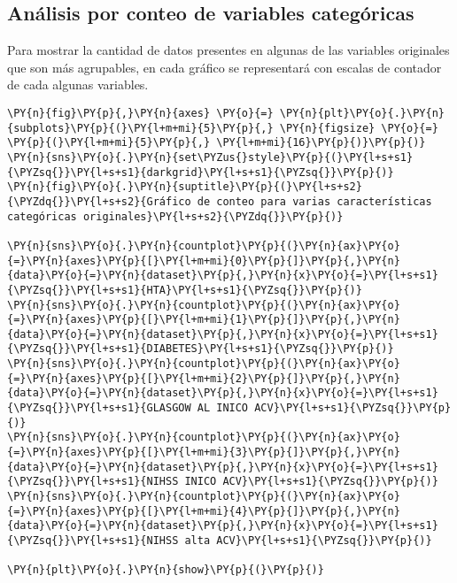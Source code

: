     \hypertarget{anuxe1lisis-por-conteo-de-variables-categuxf3ricas}{%
\subsection{Análisis por conteo de variables categóricas}\label{anuxe1lisis-por-conteo-de-variables-categuxf3ricas}}

Para mostrar la cantidad de datos presentes en algunas de las variables originales que son más agrupables, en cada gráfico se representará con escalas de contador de cada algunas variables.

    \begin{tcolorbox}[breakable, size=fbox, boxrule=1pt, pad at break*=1mm,colback=cellbackground, colframe=cellborder]
\begin{Verbatim}[commandchars=\\\{\}]
\PY{n}{fig}\PY{p}{,}\PY{n}{axes} \PY{o}{=} \PY{n}{plt}\PY{o}{.}\PY{n}{subplots}\PY{p}{(}\PY{l+m+mi}{5}\PY{p}{,} \PY{n}{figsize} \PY{o}{=} \PY{p}{(}\PY{l+m+mi}{5}\PY{p}{,} \PY{l+m+mi}{16}\PY{p}{)}\PY{p}{)}
\PY{n}{sns}\PY{o}{.}\PY{n}{set\PYZus{}style}\PY{p}{(}\PY{l+s+s1}{\PYZsq{}}\PY{l+s+s1}{darkgrid}\PY{l+s+s1}{\PYZsq{}}\PY{p}{)}
\PY{n}{fig}\PY{o}{.}\PY{n}{suptitle}\PY{p}{(}\PY{l+s+s2}{\PYZdq{}}\PY{l+s+s2}{Gráfico de conteo para varias características categóricas originales}\PY{l+s+s2}{\PYZdq{}}\PY{p}{)}

\PY{n}{sns}\PY{o}{.}\PY{n}{countplot}\PY{p}{(}\PY{n}{ax}\PY{o}{=}\PY{n}{axes}\PY{p}{[}\PY{l+m+mi}{0}\PY{p}{]}\PY{p}{,}\PY{n}{data}\PY{o}{=}\PY{n}{dataset}\PY{p}{,}\PY{n}{x}\PY{o}{=}\PY{l+s+s1}{\PYZsq{}}\PY{l+s+s1}{HTA}\PY{l+s+s1}{\PYZsq{}}\PY{p}{)}
\PY{n}{sns}\PY{o}{.}\PY{n}{countplot}\PY{p}{(}\PY{n}{ax}\PY{o}{=}\PY{n}{axes}\PY{p}{[}\PY{l+m+mi}{1}\PY{p}{]}\PY{p}{,}\PY{n}{data}\PY{o}{=}\PY{n}{dataset}\PY{p}{,}\PY{n}{x}\PY{o}{=}\PY{l+s+s1}{\PYZsq{}}\PY{l+s+s1}{DIABETES}\PY{l+s+s1}{\PYZsq{}}\PY{p}{)}
\PY{n}{sns}\PY{o}{.}\PY{n}{countplot}\PY{p}{(}\PY{n}{ax}\PY{o}{=}\PY{n}{axes}\PY{p}{[}\PY{l+m+mi}{2}\PY{p}{]}\PY{p}{,}\PY{n}{data}\PY{o}{=}\PY{n}{dataset}\PY{p}{,}\PY{n}{x}\PY{o}{=}\PY{l+s+s1}{\PYZsq{}}\PY{l+s+s1}{GLASGOW AL INICO ACV}\PY{l+s+s1}{\PYZsq{}}\PY{p}{)}
\PY{n}{sns}\PY{o}{.}\PY{n}{countplot}\PY{p}{(}\PY{n}{ax}\PY{o}{=}\PY{n}{axes}\PY{p}{[}\PY{l+m+mi}{3}\PY{p}{]}\PY{p}{,}\PY{n}{data}\PY{o}{=}\PY{n}{dataset}\PY{p}{,}\PY{n}{x}\PY{o}{=}\PY{l+s+s1}{\PYZsq{}}\PY{l+s+s1}{NIHSS INICO ACV}\PY{l+s+s1}{\PYZsq{}}\PY{p}{)}
\PY{n}{sns}\PY{o}{.}\PY{n}{countplot}\PY{p}{(}\PY{n}{ax}\PY{o}{=}\PY{n}{axes}\PY{p}{[}\PY{l+m+mi}{4}\PY{p}{]}\PY{p}{,}\PY{n}{data}\PY{o}{=}\PY{n}{dataset}\PY{p}{,}\PY{n}{x}\PY{o}{=}\PY{l+s+s1}{\PYZsq{}}\PY{l+s+s1}{NIHSS alta ACV}\PY{l+s+s1}{\PYZsq{}}\PY{p}{)}

\PY{n}{plt}\PY{o}{.}\PY{n}{show}\PY{p}{(}\PY{p}{)}
\end{Verbatim}
\end{tcolorbox}

